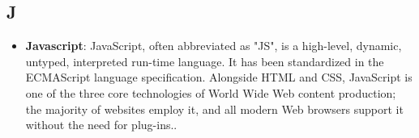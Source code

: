 \subsection*{J}
\begin{itemize}
	\item
	\textbf{Javascript}: JavaScript, often abbreviated as "JS", is a high-level, dynamic, untyped, interpreted run-time language. It has been standardized in the ECMAScript language specification. Alongside HTML and CSS, JavaScript is one of the three core technologies of World Wide Web content production; the majority of websites employ it, and all modern Web browsers support it without the need for plug-ins..
\end{itemize}
\newpage
